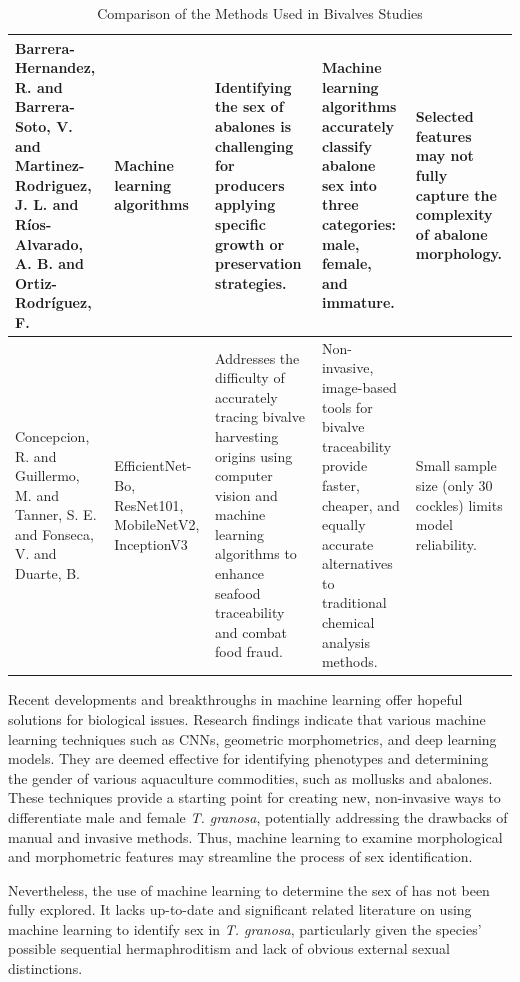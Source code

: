 \begin{table}[]
\begin{adjustbox}{scale=0.55,center}
\begin{tabular}{|p{5cm}|p{5cm}|p{8cm}|p{8cm}|p{8cm}|}
			Barrera-Hernandez, R. and Barrera-Soto, V. and Martinez-Rodriguez, J. L. and Ríos-Alvarado, A. B. and Ortiz-Rodríguez, F. &
			Machine learning algorithms &
			Identifying the sex of abalones is challenging for producers applying specific growth or preservation strategies. &
			Machine learning algorithms accurately classify abalone sex into three categories: male, female, and immature. &
			Selected features may not fully capture the complexity of abalone morphology. \\ \hline
			
			Concepcion, R. and Guillermo, M. and Tanner, S. E. and Fonseca, V. and Duarte, B. &
			EfficientNet-Bo, ResNet101, MobileNetV2, InceptionV3 &
			Addresses the difficulty of accurately tracing bivalve harvesting origins using computer vision and machine learning algorithms to enhance seafood traceability and combat food fraud. &
			Non-invasive, image-based tools for bivalve traceability provide faster, cheaper, and equally accurate alternatives to traditional chemical analysis methods. &
			Small sample size (only 30 cockles) limits model reliability. \\ \hline
			
		\end{tabular}
		
	\end{adjustbox}
	\caption{Comparison of the Methods Used in Bivalves Studies}
	\label{table:1}
\end{table}

\newpage

Recent developments and breakthroughs in machine learning offer hopeful solutions for biological issues. Research findings indicate that various machine learning techniques such as CNNs, geometric morphometrics, and deep learning models. They are deemed effective for identifying phenotypes and determining the gender of various aquaculture commodities, such as mollusks and abalones. These techniques provide a starting point for creating new, non-invasive ways to differentiate male and female \textit{T. granosa}, potentially addressing the drawbacks of manual and invasive methods. Thus, machine learning to examine morphological and morphometric features may streamline the process of sex identification.

Nevertheless, the use of machine learning to determine the sex of \Tgranosa has not been fully explored. It lacks up-to-date and significant related literature on using machine learning to identify sex in \textit{T. granosa}, particularly given the species’ possible sequential hermaphroditism and lack of obvious external sexual distinctions.
